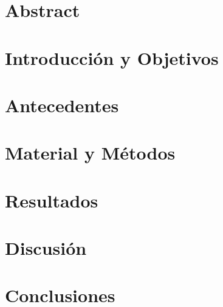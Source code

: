 \documentclass[b5paper,twoside,10pt]{book}
\begin{document}
\tableofcontents
\listoffigures
\listoftables
\clearpage



\mainmatter %

\pagestyle{fancy}
\lhead{\uppercase{\bfseries{\leftmark}}}
\rhead{\uppercase{\bfseries{\rightmark}}}
\fancyhead[LO]{\bfseries{}}
\fancyhead[RE]{\bfseries{}}
\cfoot{\thepage}
\renewcommand{\headrulewidth}{0,2pt}
\chapter{Abstract}


\chapter{Introducción y Objetivos}


\chapter{Antecedentes}


\chapter{Material y Métodos}


\chapter{Resultados}


\chapter{Discusión}


\chapter{Conclusiones}



\begin{singlespace}
	\begin{footnotesize}
		\begin{twocolumn}

\end{twocolumn}
\end{footnotesize}
\end{singlespace}
\end{document}
